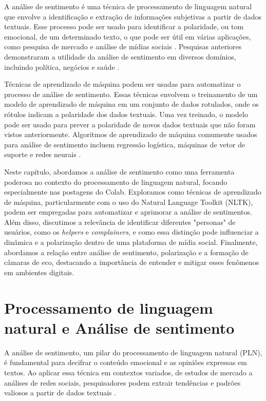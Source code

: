 A análise de sentimento é uma técnica de processamento de linguagem natural que envolve a identificação e extração de informações subjetivas a partir de dados textuais. Esse processo pode ser usado para identificar a polaridade, ou tom emocional, de um determinado texto, o que pode ser útil em várias aplicações, como pesquisa de mercado e análise de mídias sociais \cite{2008_Pang}. Pesquisas anteriores demonstraram a utilidade da análise de sentimento em diversos domínios, incluindo política, negócios e saúde \cite{2016_Chen_IP}.

Técnicas de aprendizado de máquina podem ser usadas para automatizar o processo de análise de sentimento. Essas técnicas envolvem o treinamento de um modelo de aprendizado de máquina em um conjunto de dados rotulados, onde os rótulos indicam a polaridade dos dados textuais. Uma vez treinado, o modelo pode ser usado para prever a polaridade de novos dados textuais que não foram vistos anteriormente. Algoritmos de aprendizado de máquina comumente usados para análise de sentimento incluem regressão logística, máquinas de vetor de suporte e redes neurais \cite{2013_Haddi}.

Neste capítulo, abordamos a análise de sentimento como uma ferramenta poderosa no contexto do processamento de linguagem natural, focando especialmente nas postagens do Colab. Exploramos como técnicas de aprendizado de máquina, particularmente com o uso do Natural Language Toolkit (NLTK), podem ser empregadas para automatizar e aprimorar a análise de sentimentos. Além disso, discutimos a relevância de identificar diferentes "personas" de usuários, como os \textit{helpers} e \textit{complainers}, e como essa distinção pode influenciar a dinâmica e a polarização dentro de uma plataforma de mídia social. Finalmente, abordamos a relação entre análise de sentimento, polarização e a formação de câmaras de eco, destacando a importância de entender e mitigar esses fenômenos em ambientes digitais.

\section{Processamento de linguagem natural e Análise de sentimento}

A análise de sentimento, um pilar do processamento de linguagem natural (PLN), é fundamental para decifrar o conteúdo emocional e as opiniões expressas em textos. Ao aplicar essa técnica em contextos variados, de estudos de mercado a análises de redes sociais, pesquisadores podem extrair tendências e padrões valiosos a partir de dados textuais \cite{2008_Pang, 2015_Nguyen}.

